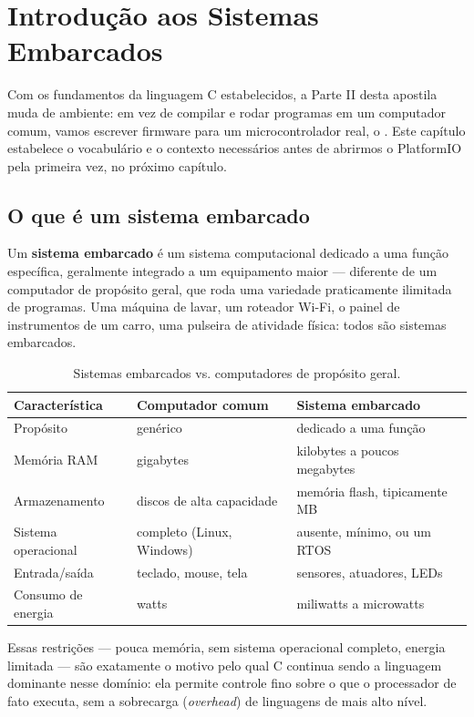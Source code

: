 \chapter{Introdução aos Sistemas Embarcados}
\label{cap:embarcados}

Com os fundamentos da linguagem C estabelecidos, a Parte II desta apostila muda de ambiente: em vez de compilar e rodar programas em um computador comum, vamos escrever firmware para um microcontrolador real, o \ESP{}. Este capítulo estabelece o vocabulário e o contexto necessários antes de abrirmos o PlatformIO pela primeira vez, no próximo capítulo.

\section{O que é um sistema embarcado}

Um \textbf{sistema embarcado} é um sistema computacional dedicado a uma função específica, geralmente integrado a um equipamento maior — diferente de um computador de propósito geral, que roda uma variedade praticamente ilimitada de programas. Uma máquina de lavar, um roteador Wi-Fi, o painel de instrumentos de um carro, uma pulseira de atividade física: todos são sistemas embarcados.

\begin{table}[h]
\centering
\begin{tabular}{@{}lll@{}}
\toprule
\textbf{Característica} & \textbf{Computador comum} & \textbf{Sistema embarcado} \\
\midrule
Propósito       & genérico            & dedicado a uma função \\
Memória RAM     & gigabytes           & kilobytes a poucos megabytes \\
Armazenamento   & discos de alta capacidade & memória flash, tipicamente MB \\
Sistema operacional & completo (Linux, Windows) & ausente, mínimo, ou um RTOS \\
Entrada/saída   & teclado, mouse, tela & sensores, atuadores, LEDs \\
Consumo de energia & watts        & miliwatts a microwatts \\
\bottomrule
\end{tabular}
\caption{Sistemas embarcados vs. computadores de propósito geral.}
\end{table}

Essas restrições — pouca memória, sem sistema operacional completo, energia limitada — são exatamente o motivo pelo qual C continua sendo a linguagem dominante nesse domínio: ela permite controle fino sobre o que o processador de fato executa, sem a sobrecarga (\emph{overhead}) de linguagens de mais alto nível.

